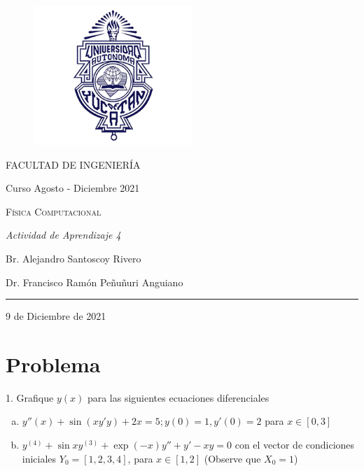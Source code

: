 \documentclass[a4paper, 12pt]{article}
\begin{document}
    \begin{center}
        \begin{Large}

            \begin{figure}[H]	
                \centering
                \includegraphics[width = 6cm]{./img/logo_UADY.png}
                \label{uady}
            \end{figure}
            \textsc{FACULTAD DE INGENIERÍA}
                
            \medskip

            Curso Agosto - Diciembre 2021

            \medskip

            \textsc{Física Computacional}

            \medskip

            \textsl{Actividad de Aprendizaje 4}

            \medskip

            Br. Alejandro Santoscoy Rivero

            \medskip

            Dr. Francisco Ramón Peñuñuri Anguiano

            \rule{0.3\paperwidth}{0.5pt}

            \medskip

            9 de Diciembre de 2021

        \end{Large}
    \end{center}
    \newpage

    \section{Problema}

    1. Grafique $y(x)$ para las siguientes ecuaciones diferenciales

    \begin{enumerate}[a)]
        \item $y''(x) + \sin (xy'y)+2x = 5; y(0) = 1, y'(0) = 2$ para $x \in [0,3]$
        \item $y^{(4)}+\sin xy^{(3)} + \exp (-x) y'' + y' - xy = 0$ con el vector de condiciones iniciales $Y_0 = [1,2,3,4]$, para $x \in [1,2]$ (Observe que $X_0 = 1$)
    \end{enumerate}
\end{document}
